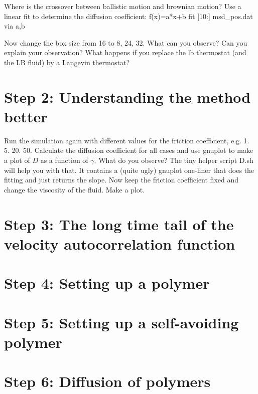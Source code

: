 Where is the crossover between ballistic motion and brownian motion?
Use a linear fit to determine the diffusion coefficient:
f(x)=a*x+b
fit [10:] msd_pos.dat via a,b

Now change the box size from 16 to 8, 24, 32. What can you observe?
Can you explain your observation?
What happens if you replace the lb thermostat (and the LB fluid)
by a Langevin thermostat?

\section{Step 2: Understanding the method better}
Run the simulation again with different values for the friction
coefficient, e.g. 1. 5. 20. 50. Calculate the diffusion
coefficient for all cases and use gnuplot to make a plot of
$D$ as a function of $\gamma$. What do you observe?
The tiny helper script D.sh will help you with that. It contains
a (quite ugly) gnuplot one-liner that does the fitting and just
returns the slope. Now keep the friction coefficient fixed and
change the viscosity of the fluid. Make a plot.

\section{Step 3: The long time tail of the velocity autocorrelation function}

\section{Step 4: Setting up a polymer}

\section{Step 5: Setting up a self-avoiding polymer}

\section{Step 6: Diffusion of polymers}



